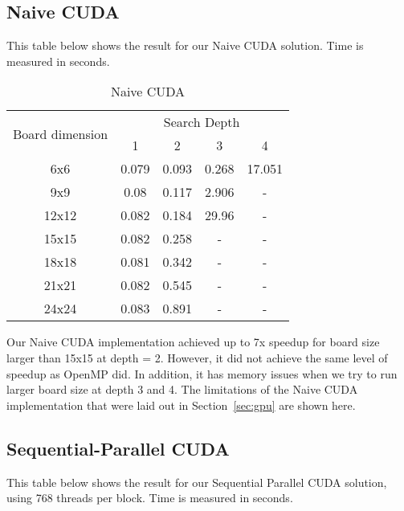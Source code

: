 \subsection{Naive CUDA}
This table below shows the result for our Naive CUDA solution. Time is measured in seconds.
\begin{table}[!htbp]
\centering
\begin{tabular}{|c|c|c|c|c|} 
\hline
\multirow{2}{*}{Board dimension} & \multicolumn{4}{c|}{Search Depth}     \\ 
\cline{2-5}
                                 & 1       & 2      & 3       & 4        \\ 
\hline
6x6                              & 0.079   & 0.093 & 0.268  & 17.051    \\ 
\hline
9x9                              & 0.08    & 0.117 & 2.906  & -   \\ 
\hline
12x12                            & 0.082   & 0.184 & 29.96 & -  \\ 
\hline
15x15                            & 0.082   & 0.258 & -      & -        \\ 
\hline
18x18                            & 0.081   & 0.342 & -      & -        \\ 
\hline
21x21                            & 0.082   & 0.545 & -      & -        \\ 
\hline
24x24                            & 0.083   & 0.891 & -      & -        \\
\hline
\end{tabular}
\caption{Naive CUDA}
\end{table}

\noindent
Our Naive CUDA implementation achieved up to 7x speedup for board size larger than 15x15 at depth = 2. However, it did not achieve the same level of speedup as OpenMP did. In addition, it has memory issues when we try to run larger board size at depth 3 and 4. The limitations of the Naive CUDA implementation that were laid out in Section~\ref{sec:gpu} are shown here.\\

\subsection{Sequential-Parallel CUDA}
This table below shows the result for our Sequential Parallel CUDA solution, using 768 threads per block. Time is measured in seconds.

